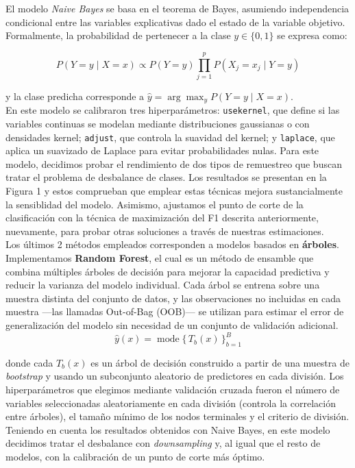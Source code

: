 \documentclass[12pt,a4paper,onecolumn]{article}
\begin{document}
El modelo \textit{Naive Bayes} se basa en el teorema de Bayes, asumiendo independencia condicional entre las variables explicativas dado el estado de la variable objetivo. Formalmente, la probabilidad de pertenecer a la clase \(y \in \{0,1\}\) se expresa como:

\[
P(Y = y \mid X = x) \propto P(Y = y) \prod_{j=1}^{p} P(X_j = x_j \mid Y = y)
\]

y la clase predicha corresponde a \(\hat{y} = \arg\max_{y} P(Y = y \mid X = x)\).\\

En este modelo se calibraron tres hiperparámetros: \texttt{usekernel}, que define si las variables continuas se modelan mediante distribuciones gaussianas o con densidades kernel; \texttt{adjust}, que controla la suavidad del kernel; y \texttt{laplace}, que aplica un suavizado de Laplace para evitar probabilidades nulas. Para este modelo, decidimos probar el rendimiento de dos tipos de remuestreo que buscan tratar el problema de desbalance de clases. Los resultados se presentan en la Figura 1 y estos comprueban que emplear estas técnicas mejora sustancialmente la sensiblidad del modelo. Asimismo, ajustamos el punto de corte de la clasificación con la técnica de maximización del F1 descrita anteriormente, nuevamente, para probar otras soluciones a través de nuestras estimaciones. \\

Los últimos 2 métodos empleados corresponden a modelos basados en \textbf{árboles}. Implementamos \textbf{Random Forest}, el cual es un método de ensamble que combina múltiples árboles de decisión para mejorar la capacidad predictiva y reducir la varianza del modelo individual. Cada árbol se entrena sobre una muestra distinta del conjunto de datos, y las observaciones no incluidas en cada muestra —las llamadas Out-of-Bag (OOB)— se utilizan para estimar el error de generalización del modelo sin necesidad de un conjunto de validación adicional.\\

\[
\hat{y}(x) = \operatorname{mode}\{\, T_b(x) \,\}_{b=1}^{B}
\]

donde cada \(T_b(x)\) es un árbol de decisión construido a partir de una muestra de \textit{bootstrap} y usando un subconjunto aleatorio de predictores en cada división. Los hiperparámetros que elegimos mediante validación cruzada fueron el número de variables seleccionadas aleatoriamente en cada división (controla la correlación entre árboles), el tamaño mínimo de los nodos terminales y el criterio de división. Teniendo en cuenta los resultados obtenidos con Naive Bayes, en este modelo decidimos tratar el desbalance con \textit{downsampling} y, al igual que el resto de modelos, con la calibración de un punto de corte más óptimo.\\
\end{document}
